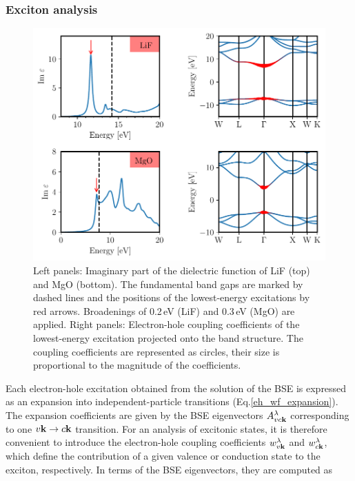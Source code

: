 \subsubsection{Exciton analysis}\label{subsec_exc_ana}
\begin{figure}[t]
  \includegraphics{work/plots/spectra/spectrum_lif_mgo.pdf}
\caption[Optical spectrum and electron-hole coupling coefficients of the first excitation in LiF and MgO.]{Left panels: Imaginary part of the dielectric function of LiF (top) and MgO (bottom).  The fundamental band gaps are marked by  dashed lines and the positions of the lowest-energy excitations by red arrows. Broadenings of 0.2\,eV (LiF) and 0.3\,eV (MgO) are applied. Right panels: Electron-hole coupling coefficients of the  lowest-energy excitation projected onto the band structure. The coupling coefficients are represented as circles, their size is proportional to the magnitude of the coefficients.\label{spectrum_figure}}
\end{figure}
Each electron-hole excitation obtained from the solution of the BSE is expressed as an expansion into independent-particle transitions (Eq.\;\eqref{eh_wf_expansion}). The expansion coefficients are given by the BSE eigenvectors $A^\lambda_{vc\mathbf{k}}$ corresponding to one $v\mathbf{k}\rightarrow c\mathbf{k}$ transition.  For an analysis of excitonic states, it is therefore convenient to introduce the electron-hole coupling coefficients  $w^\lambda_{v\mathbf{k}}$ and $w^\lambda_{c\mathbf{k}}$,  which define the contribution of a given valence or conduction state to the exciton, respectively. In terms of the BSE eigenvectors, they are computed as
